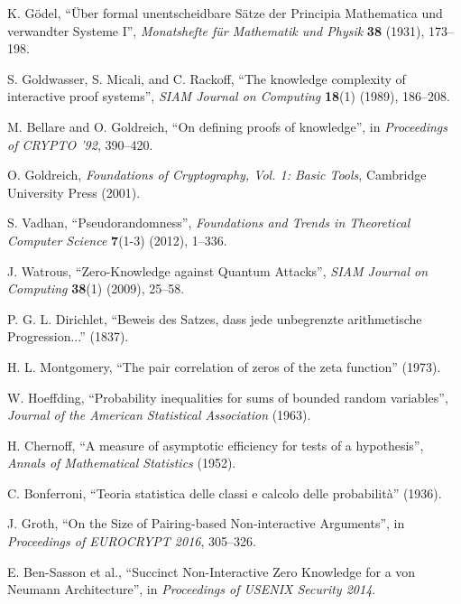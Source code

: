 \documentclass[12pt]{article}
\theoremstyle{plain}
\theoremstyle{definition}
\begin{document}

\begin{thebibliography}{99}

 K. G\"{o}del, ``\"{U}ber formal unentscheidbare S\"{a}tze der Principia Mathematica und verwandter Systeme I'', \emph{Monatshefte f\"{u}r Mathematik und Physik} \textbf{38} (1931), 173--198.

 S. Goldwasser, S. Micali, and C. Rackoff, ``The knowledge complexity of interactive proof systems'', \emph{SIAM Journal on Computing} \textbf{18}(1) (1989), 186--208.

 M. Bellare and O. Goldreich, ``On defining proofs of knowledge'', in \emph{Proceedings of CRYPTO '92}, 390--420.

 O. Goldreich, \emph{Foundations of Cryptography, Vol. 1: Basic Tools}, Cambridge University Press (2001).

 S. Vadhan, ``Pseudorandomness'', \emph{Foundations and Trends in Theoretical Computer Science} \textbf{7}(1-3) (2012), 1--336.

 J. Watrous, ``Zero-Knowledge against Quantum Attacks'', \emph{SIAM Journal on Computing} \textbf{38}(1) (2009), 25--58.

 P. G. L. Dirichlet, ``Beweis des Satzes, dass jede unbegrenzte arithmetische Progression...'' (1837).

 H. L. Montgomery, ``The pair correlation of zeros of the zeta function'' (1973).

 W. Hoeffding, ``Probability inequalities for sums of bounded random variables'', \emph{Journal of the American Statistical Association} (1963).

 H. Chernoff, ``A measure of asymptotic efficiency for tests of a hypothesis'', \emph{Annals of Mathematical Statistics} (1952).

 C. Bonferroni, ``Teoria statistica delle classi e calcolo delle probabilit\`{a}'' (1936).

 J. Groth, ``On the Size of Pairing-based Non-interactive Arguments'', in \emph{Proceedings of EUROCRYPT 2016}, 305--326.

 E. Ben-Sasson et al., ``Succinct Non-Interactive Zero Knowledge for a von Neumann Architecture'', in \emph{Proceedings of USENIX Security 2014}.

\end{thebibliography}
\end{document}
